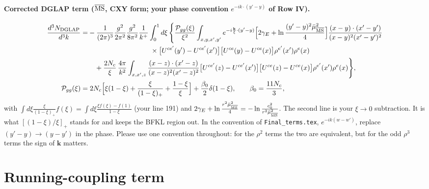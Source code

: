 \documentclass[10pt]{article}
\newcommand{\mub}{\bar\mu_{\overline{\rm MS}}}
\begin{document}
\paragraph{Corrected DGLAP term ($\overline{\rm MS}$, CXY form; your phase convention $e^{-ik\cdot(y'-y)}$ of Row IV).}
\begin{align*}
\frac{d^3N_{\rm DGLAP}}{d^3k}=&-\frac{1}{(2\pi)^3}\frac{g^2}{2\pi^2}\frac{g^2}{8\pi^2}\frac1{k^+}\int_0^1d\xi\,\Bigg\{\frac{\mathcal P_{gg}(\xi)}{\xi^2}\int_{x,y,x',y'}e^{-i\frac{\mathbf k}{\xi}\cdot(y'-y)}
\Big[2\gamma_E+\ln\frac{(y'-y)^2\mub^2}{4}\Big]\frac{(x-y)\cdot(x'-y')}{(x-y)^2(x'-y')^2}\\
&\hspace{3.2cm}\times\big[U^{ce'}(y')-U^{ce'}(x')\big]\big[U^{ce}(y)-U^{ce}(x)\big]\rho^{e'}(x')\rho^e(x)\\
&\quad+\frac{2N_c}{\xi}\,\frac{4\pi}{k^2}\int_{x,x',z}\frac{(x-z)\cdot(x'-z)}{(x-z)^2(x'-z)^2}\big[U^{ce'}(z)-U^{ce'}(x')\big]\big[U^{ce}(z)-U^{ce}(x)\big]\rho^{e'}(x')\rho^e(x)\Bigg\},\\
\mathcal P_{gg}(\xi)=&\;2N_c\Big[\xi(1-\xi)+\frac{\xi}{(1-\xi)_+}+\frac{1-\xi}{\xi}\Big]+\frac{\beta_0}{2}\delta(1-\xi),\qquad\beta_0=\frac{11N_c}{3},
\end{align*}
with $\int d\xi\frac{\xi}{(1-\xi)_+}f(\xi)=\int d\xi\frac{\xi f(\xi)-f(1)}{1-\xi}$ (your line 191) and $2\gamma_E+\ln\frac{r^2\mub^2}{4}=-\ln\frac{c_0^2}{r^2\mub^2}$.
The second line is your $\xi\to0$ subtraction. It is what $[(1-\xi)/\xi]_+$ stands for and keeps the BFKL region out.
In the convention of \texttt{Final\_terms.tex}, $e^{-ik(w-w')}$, replace $(y'-y)\to(y-y')$ in the phase. Please use one convention throughout: for the
$\rho^2$ terms the two are equivalent, but for the odd $\rho^3$ terms the sign of $\mathbf k$ matters.

\section{Running-coupling term}\label{sec:rc}
\end{document}
